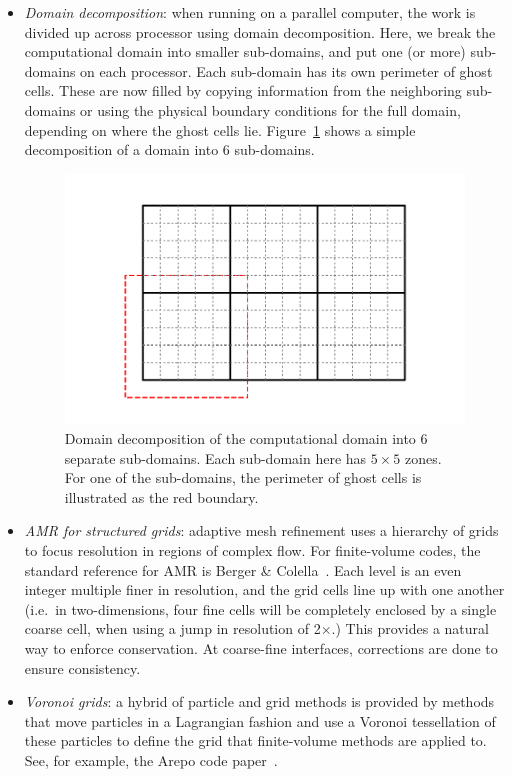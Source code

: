\begin{itemize}

\item {\em Domain decomposition}: when running on a parallel computer,
 the work is divided up across processor using domain decomposition.
 Here, we break the computational domain into smaller sub-domains, and
 put one (or more) sub-domains on each processor.  Each sub-domain
 has its own perimeter of ghost cells.  These are now filled by copying
 information from the neighboring sub-domains or using the physical
 boundary conditions for the full domain, depending on where the 
 ghost cells lie.  Figure~\ref{fig:domain} shows a simple decomposition of
 a domain into 6 sub-domains.

 \begin{figure}
 \centering
 \includegraphics[width=\linewidth]{domain}
 \caption[Domain decomposition example.]{\label{fig:domain} Domain
   decomposition of the computational domain into 6 separate
   sub-domains.  Each sub-domain here has $5\times 5$ zones.  For one
   of the sub-domains, the perimeter of ghost cells is illustrated as
   the red boundary.}
 \end{figure}

\item {\em AMR for structured grids}: adaptive mesh refinement uses a
  hierarchy of grids to focus resolution in regions of complex flow.
  For finite-volume codes, the standard reference for AMR is Berger \&
  Colella~\cite{berger-colella}.  Each level is an even integer
  multiple finer in resolution, and the grid cells line up with one
  another (i.e.\ in two-dimensions, four fine cells will be completely
  enclosed by a single coarse cell, when using a jump in resolution of
  2$\times$.)  This provides a natural way to enforce conservation.
  At coarse-fine interfaces, corrections are done to ensure
  consistency.

\item {\em Voronoi grids}: a hybrid of particle and grid methods is 
  provided by methods that move particles in a Lagrangian fashion and
  use a Voronoi tessellation of these particles to define the grid
  that finite-volume methods are applied to.  See, for example, 
  the Arepo code paper~\cite{arepo}.
\end{itemize}
